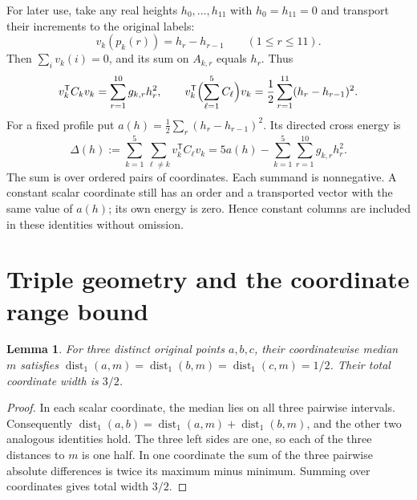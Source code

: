 \documentclass[11pt]{article}
\newtheorem{lemma}[theorem]{Lemma}
\theoremstyle{definition}
\theoremstyle{remark}
\newcommand{\dist}{\operatorname{dist}_1}
\begin{document}
For later use, take any real heights $h_0,\ldots,h_{11}$ with
$h_0=h_{11}=0$ and transport their increments to the original labels:
\[
 v_k(p_k(r))=h_r-h_{r-1}\qquad(1\leq r\leq11).
\]
Then $\sum_iv_k(i)=0$, and its sum on $A_{k,r}$ equals $h_r$. Thus
\begin{equation}\label{eq:profile}
 v_k^{\mathsf T}C_kv_k=\sum_{r=1}^{10}g_{k,r}h_r^2,
 \qquad
 v_k^{\mathsf T}\Bigl(\sum_{\ell=1}^5C_\ell\Bigr)v_k
   =\frac12\sum_{r=1}^{11}(h_r-h_{r-1})^2.
\end{equation}
For a fixed profile put $a(h)=\frac12\sum_r(h_r-h_{r-1})^2$.
Its directed cross energy is
\begin{equation}\label{eq:crossgeneral}
 \Delta(h):=\sum_{k=1}^5\sum_{\ell\ne k}v_k^{\mathsf T}C_\ell v_k
 =5a(h)-\sum_{k=1}^5\sum_{r=1}^{10}g_{k,r}h_r^2.
\end{equation}
The sum is over ordered pairs of coordinates. Each summand is
nonnegative. A constant scalar coordinate still has an order and a
transported vector with the same value of $a(h)$; its own energy is zero.
Hence constant columns are included in these identities without omission.

\section{Triple geometry and the coordinate range bound}\label{sec:range}

\begin{lemma}\label{lem:triple}
For three distinct original points $a,b,c$, their coordinatewise median
$m$ satisfies
$\dist(a,m)=\dist(b,m)=\dist(c,m)=1/2$. Their total coordinate width is
$3/2$.
\end{lemma}

\begin{proof}
In each scalar coordinate, the median lies on all three pairwise intervals.
Consequently
$\dist(a,b)=\dist(a,m)+\dist(b,m)$, and the other two analogous
identities hold. The three left sides are one, so each of the three
distances to $m$ is one half. In one coordinate the sum of the three
pairwise absolute differences is twice its maximum minus minimum.
Summing over coordinates gives total width $3/2$.
\end{proof}
\end{document}

